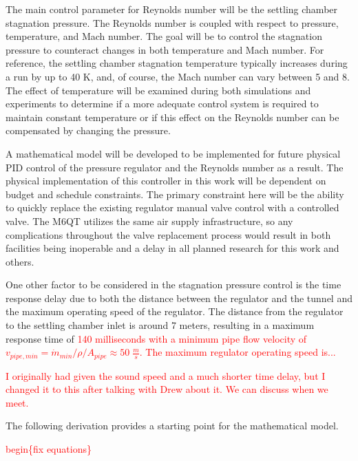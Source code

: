 The main control parameter for Reynolds number will be the settling chamber stagnation pressure. The Reynolds number is coupled with respect to pressure, temperature, and Mach number. The goal will be to control the stagnation pressure to counteract changes in both temperature and Mach number. For reference, the settling chamber stagnation temperature typically increases during a run by up to 40 K, and, of course, the Mach number can vary between 5 and 8. The effect of temperature will be examined during both simulations and experiments to determine if a more adequate control system is required to maintain constant temperature or if this effect on the Reynolds number can be compensated by changing the pressure.

A mathematical model will be developed to be implemented for future physical PID control of the pressure regulator and the Reynolds number as a result. The physical implementation of this controller in this work will be dependent on budget and schedule constraints. The primary constraint here will be the ability to quickly replace the existing regulator manual valve control with a controlled valve. The M6QT utilizes the same air supply infrastructure, so any complications throughout the valve replacement process would result in both facilities being inoperable and a delay in all planned research for this work and others.

One other factor to be considered in the stagnation pressure control is the time response delay due to both the distance between the regulator and the tunnel and the maximum operating speed of the regulator. The distance from the regulator to the settling chamber inlet is around 7 meters, resulting in a maximum response time of \textcolor{red}{140 milliseconds with a minimum pipe flow velocity of $v_{pipe,min} = \dot{m}_{min}/\rho/A_{pipe} \approx 50 \; \frac{m}{s}$. The maximum regulator operating speed is...}

\textcolor{red}{I originally had given the sound speed and a much shorter time delay, but I changed it to this after talking with Drew about it. We can discuss when we meet.}

The following derivation provides a starting point for the mathematical model.

\textcolor{red}{begin\{fix equations\}}

